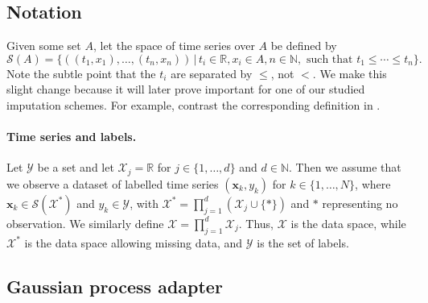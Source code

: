 \documentclass{article}
\renewcommand{\subsubsection}[1]{\textbf{#1}

} %
\newcommand{\reals}{\mathbb{R}}
\newcommand{\naturals}{\mathbb{N}}
\newcommand{\dataspace}{\mathcal{X}}
\newcommand{\lspace}{\mathcal{Y}}
\newcommand{\seriesspace}{\mathcal{S}}
\begin{document}
\subsection{Notation}

Given some set $A$, let the space of time series over $A$ be defined by
\begin{equation}
    \seriesspace(A) = \{((t_1, x_1), \ldots, (t_n, x_n)) \,\vert\, t_i \in \reals, x_i \in A, n \in \naturals, \text{ such that } t_1 \leq \cdots \leq t_n\}.\label{eq:seriesspace}
\end{equation}
%
Note the subtle point that the $t_i$ are separated by $\leq$, not $<$.
We make this slight change because it will later prove important for one
of our studied imputation schemes. For example, contrast the
corresponding definition in \citet[Section 1]{toth2019gp}.

\paragraph{Time series and labels.}
%
Let $\lspace$ be a set and let $\dataspace_j = \reals$ for $j \in \{1,
\ldots, d\}$ and $d \in \naturals$. Then we assume that we observe
a dataset of labelled time series $(\mathbf{x}_k, y_k)$ for $k \in \{1,
\ldots, N\}$, where $\mathbf{x}_k \in \seriesspace(\dataspace^*)$ and
$y_k \in \lspace$, with $\dataspace^* = \prod_{j = 1}^d(\dataspace_j
\cup \{*\})$ and $*$ representing no observation.
%
We similarly define $\dataspace = \prod_{j = 1}^d\dataspace_j$. Thus,
$\dataspace$ is the data space, while $\dataspace^*$ is the data space
allowing missing data, and $\lspace$ is the set of labels.


\subsection{Gaussian process adapter}\label{section:gpadapter}
\end{document}
